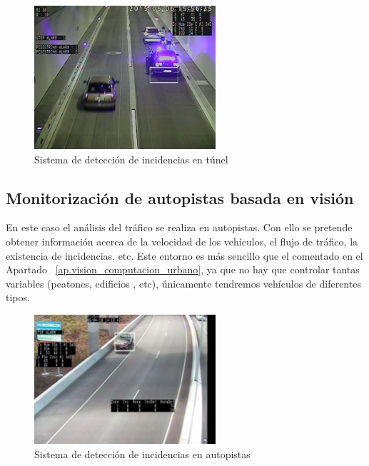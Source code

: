 \begin{figure}[H]
  \begin{center}
    \includegraphics[width=0.6\textwidth]{figures/Introduccion/detection_tunel.png}
		\caption{Sistema de detección de incidencias en túnel}
		\label{fig.deteccion_tunel}
		\end{center}
\end{figure}

\subsection{Monitorización de autopistas basada en visión}

En este caso el análisis del tráfico se realiza en autopistas. Con ello se pretende obtener información acerca de la velocidad de los vehículos, el flujo de tráfico, la existencia de incidencias, etc. Este entorno es más sencillo que el comentado en el Apartado ~\ref{ap.vision_computacion_urbano}, ya que no hay que controlar tantas variables (peatones, edificios , etc), únicamente tendremos vehículos de diferentes tipos. 

\begin{figure}[H]
  \begin{center}
    \includegraphics[width=0.6\textwidth]{figures/Introduccion/deteccion_autopistas.jpg}
		\caption{Sistema de detección de incidencias en autopistas}
		\label{fig.deteccion_autopistas}
		\end{center}
\end{figure}

